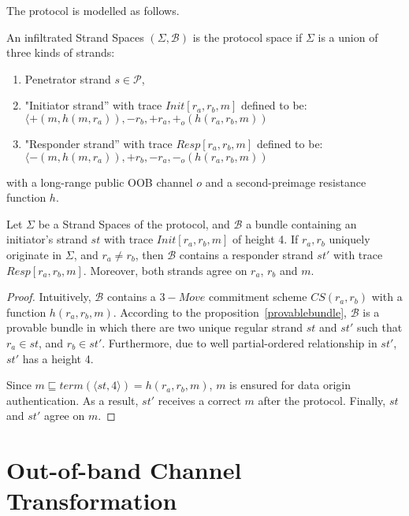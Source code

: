 The protocol is modelled as follows. 

\begin{Definition}
An infiltrated Strand Spaces $(\Sigma,\mathcal{B})$ is the protocol space if $\Sigma$ is a union of three kinds of strands:
\begin{enumerate}
\item Penetrator strand $s \in \mathcal{P}$,
\item "Initiator strand'' with trace {\small $Init[r_a,r_b,m]$} defined to be: \\ 
 {\small $\langle +(m,h(m,r_a)),-r_b,+r_a,+_o(h(r_a,r_b,m))$}
\item "Responder strand'' with trace {\small $Resp[r_a,r_b,m]$} defined to be: \\ 
 {\small $\langle -(m,h(m,r_a)),+r_b,-r_a,-_o(h(r_a,r_b,m))$}
\end{enumerate}
with a long-range public OOB channel $o$ and a second-preimage resistance function $h$. 
\end{Definition}

\begin{Proposition}
Let $\Sigma$ be a Strand Spaces of the protocol, and $\mathcal{B}$ a bundle containing an initiator's strand $st$ with trace $Init[r_a,r_b,m]$ of height 4. If $r_a,r_b$ uniquely originate in $\Sigma$, and $r_a \not= r_b$, then $\mathcal{B}$ contains a responder strand $st'$ with trace $Resp[r_a,r_b,m]$. Moreover, both strands agree on $r_a$, $r_b$ and $m$.
\end{Proposition}

\begin{proof}
Intuitively, $\mathcal{B}$ contains a $3-Move$ commitment scheme $CS(r_a,r_b)$ with a function $h(r_a,r_b,m)$. According to the proposition~\ref{provablebundle}, $\mathcal{B}$ is a provable bundle in which there are two unique regular strand $st$ and $st'$ such that $r_a \in st$, and $r_b \in st'$. Furthermore, due to well partial-ordered relationship in $st'$, $st'$ has a height 4. 

Since $m \sqsubseteq term( \langle st,4 \rangle) = h(r_a,r_b,m)$, $m$ is ensured for data origin authentication. As a result, $st'$ receives a correct $m$ after the protocol. Finally, $st$ and $st'$ agree on $m$.
\end{proof}

\section{Out-of-band Channel Transformation}

